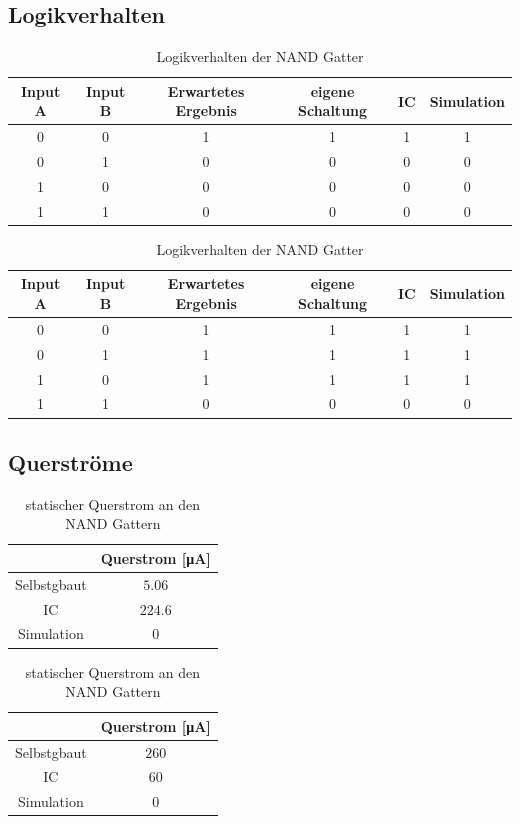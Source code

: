 \documentclass[11pt, a4paper]{article}
\begin{document}
\subsection*{Logikverhalten}


\begin{table}[H]
	\center
	\begin{tabular}{c|c||c||c|c|c}
	Input A 	& Input B 	& Erwartetes Ergebnis 	& eigene Schaltung & IC & Simulation	\\ \hline
	0 & 0 & 1 & 1 & 1 & 1		\\
	0 & 1 & 0 & 0 & 0 & 0		\\
	1 & 0 & 0 & 0 & 0 & 0		\\
	1 & 1 & 0 & 0 & 0 & 0		\\
	\end{tabular}
	\caption{Logikverhalten der NOR Gatter}
	\label{logikNOR}


	\center
	\begin{tabular}{c|c||c||c|c|c}
	Input A 	& Input B 	& Erwartetes Ergebnis 	& eigene Schaltung & IC & Simulation	\\ \hline
	0 & 0 & 1 & 1 & 1 & 1		\\
	0 & 1 & 1 & 1 & 1 & 1		\\
	1 & 0 & 1 & 1 & 1 & 1		\\
	1 & 1 & 0 & 0 & 0 & 0		\\
	\end{tabular}
	\caption{Logikverhalten der NAND Gatter}
	\label{logikNOR}
\end{table}

\subsection*{Querströme}

\begin{table}[H]
	\center
	\begin{tabular}{c|c}
	& Querstrom [\si{\micro\ampere}]	\\ \hline
	Selbstgbaut & $5.06$ 		\\
	IC 			& $224.6$ 		\\
	Simulation 	& $0$\\
	\end{tabular}
	\caption{statischer Querstrom an den NOR Gattern}
	\label{querstromNAND}


	\center
	\begin{tabular}{c|c}
	& Querstrom [\si{\micro\ampere}]	\\ \hline
	Selbstgbaut & $260$ 		\\
	IC 			& $60$ 			\\
	Simulation 	& $0$\\
	\end{tabular}
	\caption{statischer Querstrom an den NAND Gattern}
	\label{querstromNAND}
\end{table}
\end{document}
